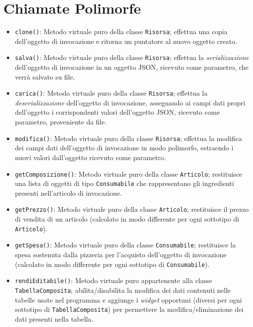 \documentclass[
  10pt,
]{article}
\providecommand{\tightlist}{%
  \setlength{\itemsep}{0pt}\setlength{\parskip}{0pt}}
\begin{document}
\hypertarget{chiamate-polimorfe}{%
\section{Chiamate Polimorfe}\label{chiamate-polimorfe}}

\begin{itemize}
\tightlist
\item
  \texttt{clone()}: Metodo virtuale puro della classe \texttt{Risorsa};
  effettua una copia dell'oggetto di invocazione e ritorna un puntatore
  al nuovo oggetto creato.
\item
  \texttt{salva()}: Metodo virtuale puro della classe \texttt{Risorsa};
  effettua la \emph{serializzazione} dell'oggetto di invocazione in un
  oggetto JSON, ricevuto come parametro, che verrà salvato su file.
\item
  \texttt{carica()}: Metodo virtuale puro della classe \texttt{Risorsa};
  effettua la \emph{deserializzazione} dell'oggetto di invocazione,
  assegnando ai campi dati propri dell'oggetto i corrispondenti valori
  dell'oggetto JSON, ricevuto come parametro, proveniente da file.
\item
  \texttt{modifica()}: Metodo virtuale puro della classe
  \texttt{Risorsa}; effettua la modifica dei campi dati dell'oggetto di
  invocazione in modo polimorfo, estraendo i nuovi valori dall'oggetto
  ricevuto come parametro.
\item
  \texttt{getComposizione()}: Metodo virtuale puro della classe
  \texttt{Articolo}; restituisce una lista di oggetti di tipo
  \texttt{Consumabile} che rappresentano gli ingredienti presenti
  nell'articolo di invocazione.
\item
  \texttt{getPrezzo()}: Metodo virtuale puro della classe
  \texttt{Articolo}; restituisce il prezzo di vendita di un articolo
  (calcolato in modo differente per ogni sottotipo di
  \texttt{Articolo}).
\item
  \texttt{getSpesa()}: Metodo virtuale puro della classe
  \texttt{Consumabile}; restituisce la spesa sostenuta dalla pizzeria
  per l'acquisto dell'oggetto di invocazione (calcolato in modo
  differente per ogni sottotipo di \texttt{Consumabile}).
\item
  \texttt{rendiEditabile()}: Metodo virtuale puro appartenente alla
  classe \texttt{TabellaComposita}; abilita/disabilita la modifica dei
  dati contenuti nelle tabelle usate nel programma e aggiunge i
  \emph{widget} opportuni (diversi per ogni sottotipo di
  \texttt{TabellaComposita}) per permettere la modifica/eliminazione dei
  dati presenti nella tabella.
\end{itemize}
\end{document}
